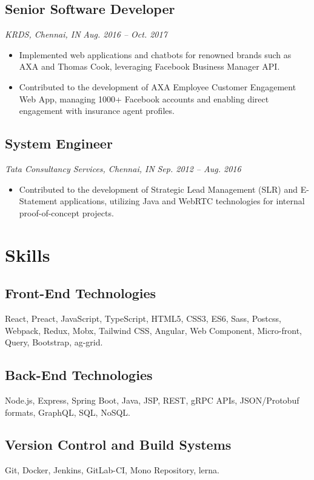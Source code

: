 \documentclass{article}
\begin{document}
\subsection*{Senior Software Developer}
\textit{KRDS, Chennai, IN} \hfill \textit{Aug. 2016 – Oct. 2017}
\begin{itemize}[noitemsep]
    \item Implemented web applications and chatbots for renowned brands such as AXA and Thomas Cook, leveraging Facebook Business Manager API.
    \item Contributed to the development of AXA Employee Customer Engagement Web App, managing 1000+ Facebook accounts and enabling direct engagement with insurance agent profiles.
\end{itemize}

\subsection*{System Engineer}
\textit{Tata Consultancy Services, Chennai, IN} \hfill \textit{Sep. 2012 – Aug. 2016}
\begin{itemize}[noitemsep]
    \item Contributed to the development of Strategic Lead Management (SLR) and E-Statement applications, utilizing Java and WebRTC technologies for internal proof-of-concept projects.
\end{itemize}

\section*{Skills}

\subsection*{Front-End Technologies}
React, Preact, JavaScript, TypeScript, HTML5, CSS3, ES6, Sass, Postcss, Webpack, Redux, Mobx, Tailwind CSS, Angular, Web Component, Micro-front, Query, Bootstrap, ag-grid.

\subsection*{Back-End Technologies}
Node.js, Express, Spring Boot, Java, JSP, REST, gRPC APIs, JSON/Protobuf formats, GraphQL, SQL, NoSQL.

\subsection*{Version Control and Build Systems}
Git, Docker, Jenkins, GitLab-CI, Mono Repository, lerna.
\end{document}
